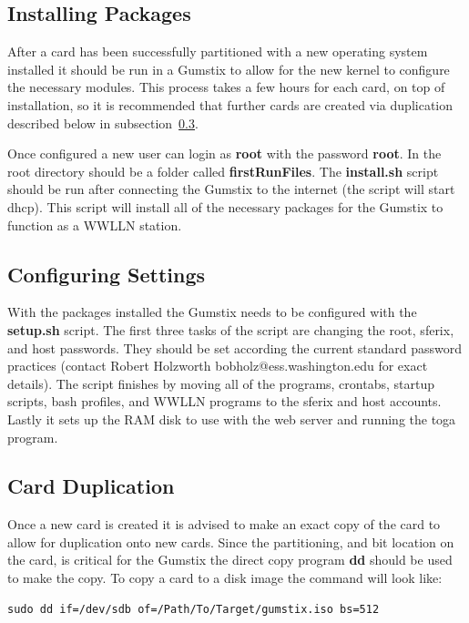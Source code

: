\subsection{Installing Packages}

After a card has been successfully partitioned with a new operating system installed it should be run in a Gumstix to allow for the new kernel to configure the necessary modules.
This process takes a few hours for each card, on top of installation, so it is recommended that further cards are created via duplication described below in subsection~\ref{app:gumstix:duplication}.

Once configured a new user can login as {\bf root} with the password {\bf root}.
In the root directory should be a folder called {\bf firstRunFiles}.
The {\bf install.sh} script should be run after connecting the Gumstix to the internet (the script will start dhcp).
This script will install all of the necessary packages for the Gumstix to function as a WWLLN station.

\subsection{Configuring Settings}

With the packages installed the Gumstix needs to be configured with the {\bf setup.sh} script.
The first three tasks of the script are changing the root, sferix, and host passwords.
They should be set according the current standard password practices (contact Robert Holzworth bobholz@ess.washington.edu for exact details).
The script finishes by moving all of the programs, crontabs, startup scripts, bash profiles, and WWLLN programs to the sferix and host accounts.
Lastly it sets up the RAM disk to use with the web server and running the toga program.

\subsection{Card Duplication}
\label{app:gumstix:duplication}

Once a new card is created it is advised to make an exact copy of the card to allow for duplication onto new cards.
Since the partitioning, and bit location on the card, is critical for the Gumstix the direct copy program {\bf dd} should be used to make the copy.
To copy a card to a disk image the command will look like:

\begin{verbatim}
sudo dd if=/dev/sdb of=/Path/To/Target/gumstix.iso bs=512
\end{verbatim}

